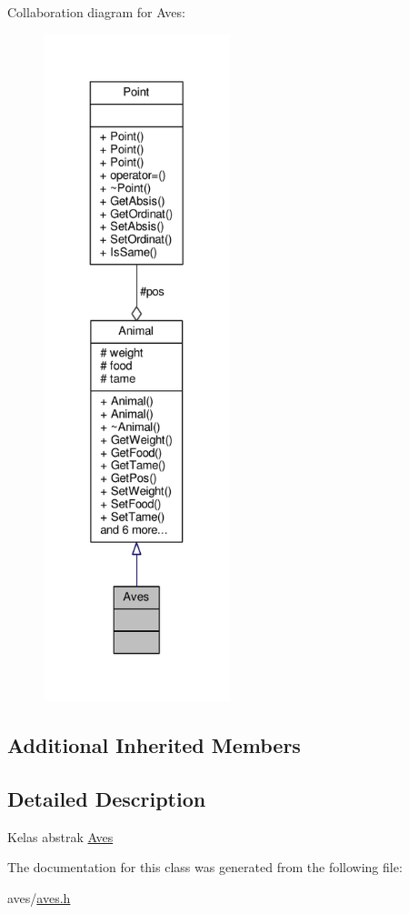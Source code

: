 Collaboration diagram for Aves\+:
\nopagebreak
\begin{figure}[H]
\begin{center}
\leavevmode
\includegraphics[height=550pt]{classAves__coll__graph}
\end{center}
\end{figure}
\subsection*{Additional Inherited Members}


\subsection{Detailed Description}
Kelas abstrak \hyperlink{classAves}{Aves} 

The documentation for this class was generated from the following file\+:\begin{DoxyCompactItemize}
\item 
aves/\hyperlink{aves_8h}{aves.\+h}\end{DoxyCompactItemize}
